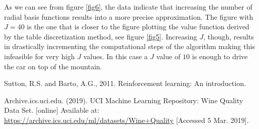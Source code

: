 \documentclass[runningheads]{llncs}
\begin{document}
As we can see from figure \ref{fig6}, the data indicate that
increasing the number of radial basis functions results into a more
precise approximation. The figure with $J = 40$ is the one that is
closer to the figure plotting the value function derived by the table
discretization method, see figure \ref{fig5}. Increasing $J$,
though, results in drastically incrementing the computational steps of the
algorithm making this infeasible for very high $J$ values. In this
case a $J$ value of $10$ is enough to drive the car on top of the
mountain. 


\begin{thebibliography}{8}

Sutton, R.S. and Barto, A.G., 2011. Reinforcement learning: An introduction.

Archive.ics.uci.edu. (2019). UCI Machine Learning Repository: Wine Quality Data Set. [online] Available at: \url{https://archive.ics.uci.edu/ml/datasets/Wine+Quality} [Accessed 5 Mar. 2019].

\end{thebibliography}
\end{document}
